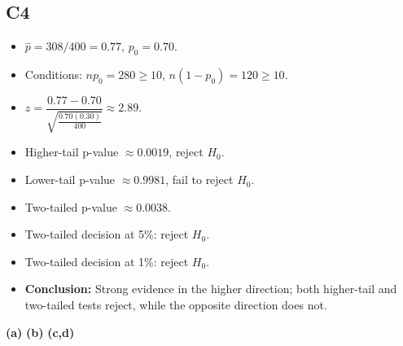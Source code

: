 \subsection*{C4}
\begin{itemize}
    \item \(\hat p=308/400=0.77\), \(p_0=0.70\).
    \item Conditions: \(np_0=280\ge10\), \(n(1-p_0)=120\ge10\).
    \item \(z=\dfrac{0.77-0.70}{\sqrt{\frac{0.70(0.30)}{400}}}\approx 2.89\).
    \item Higher-tail p-value \(\approx 0.0019\), reject \(H_0\).
    \item Lower-tail p-value \(\approx 0.9981\), fail to reject \(H_0\).
    \item Two-tailed p-value \(\approx 0.0038\).
    \item Two-tailed decision at 5\%: reject \(H_0\).
    \item Two-tailed decision at 1\%: reject \(H_0\).
    \item \textbf{Conclusion:} Strong evidence in the higher direction; both higher-tail and two-tailed tests reject, while the opposite direction does not.
\end{itemize}

\begin{center}
\textbf{(a)}\;
\hspace{0.5cm}
\textbf{(b)}\;
\hspace{0.5cm}
\textbf{(c,d)}\;
\end{center}


